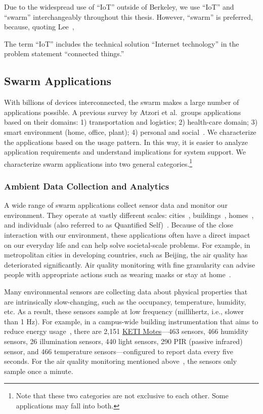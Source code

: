 Due to the widespread use of ``IoT'' outside of Berkeley, we use ``IoT'' and
``swarm'' interchangeably throughout this thesis. However, ``swarm'' is
preferred, because, quoting Lee~\cite{lee2016iot},

\begin{displayquote}
  The term ``IoT'' includes the technical solution ``Internet technology'' in
  the problem statement ``connected things.''
\end{displayquote}

\subsection{Swarm Applications}
\label{sec:swarm-applications}

With billions of devices interconnected, the swarm makes a large number of
applications possible. A previous survey by Atzori et al.\, groups applications
based on their domains: 1) transportation and logistics; 2) health-care domain;
3) smart environment (home, office, plant); 4) personal and
social~\cite{atzori2010internet}. We characterize the applications based on the
usage pattern. In this way, it is easier to analyze application requirements and
understand implications for system support. We characterize swarm applications
into two general categories.\footnote{Note that these two categories are not
  exclusive to each other. Some applications may fall into both.}

\subsubsection{Ambient Data Collection and Analytics}
\label{sec:ambi-data-coll}

A wide range of swarm applications collect sensor data and monitor our
environment. They operate at vastly different scales:
cities~\cite{cheng2014aircloud, sfpark}, buildings~\cite{dawson2010smap},
homes~\cite{hnat2011hitchhiker}, and individuals (also referred to as Quantified
Self)~\cite{fitbit, swan2013quantified}. Because of the close interaction with
our environment, these applications often have a direct impact on our everyday
life and can help solve societal-scale problems. For example, in metropolitan
cities in developing countries, such as Beijing, the air quality has
deteriorated significantly. Air quality monitoring with fine granularity can
advise people with appropriate actions such as wearing masks or stay at
home~\cite{cheng2014aircloud}.

Many environmental sensors are collecting data about physical properties that
are intrinsically slow-changing, such as the occupancy, temperature, humidity,
etc. As a result, these sensors sample at low frequency (millihertz, i.e.,
slower than 1 Hz). For example, in a campus-wide building instrumentation that
aims to reduce energy usage~\cite{krioukov2012building}, there are 2,151
\href{http://www.keti.re.kr/}{KETI Motes}---463  sensors, 466 humidity
sensors, 26 illumination sensors, 440 light sensors, 290 PIR (passive infrared)
sensor, and 466 temperature sensors---configured to report data every five
seconds. For the air quality monitoring mentioned
above~\cite{cheng2014aircloud}, the sensors only sample once a minute.

